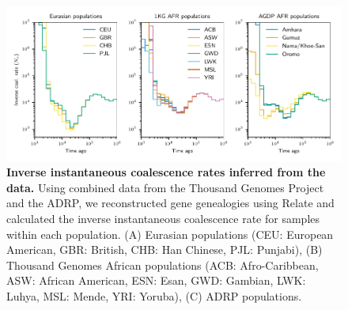 \documentclass[]{article}
\begin{document}
\begin{figure}[ht]
    \centering
    \includegraphics{figures/supp-relate-iicr-data}
    \caption{
        \textbf{Inverse instantaneous coalescence rates inferred from the data.}
        Using combined data from the Thousand Genomes Project and the ADRP,
        we reconstructed gene genealogies using Relate and calculated the
        inverse instantaneous coalescence rate for samples within each population.
        (A) Eurasian populations (CEU: European American, GBR: British,
        CHB: Han Chinese, PJL: Punjabi), (B) Thousand Genomes African populations
        (ACB: Afro-Caribbean, ASW: African American, ESN: Esan, GWD: Gambian,
        LWK: Luhya, MSL: Mende, YRI: Yoruba), (C) ADRP populations.
    }
    \label{fig:supp-iicr-data}
\end{figure}
\end{document}
